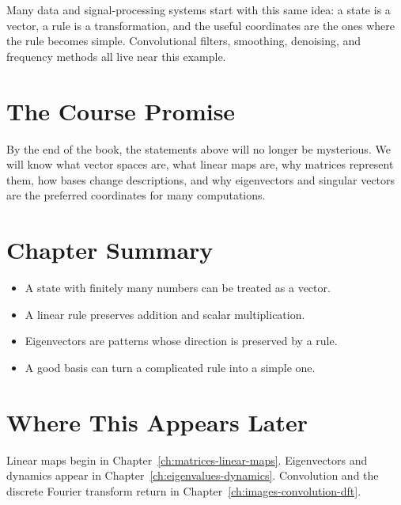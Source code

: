 \begin{aimlbox}
Many data and signal-processing systems start with this same idea: a state is
a vector, a rule is a transformation, and the useful coordinates are the ones
where the rule becomes simple. Convolutional filters, smoothing, denoising, and
frequency methods all live near this example.
\end{aimlbox}

\section{The Course Promise}

By the end of the book, the statements above will no longer be mysterious. We
will know what vector spaces are, what linear maps are, why matrices represent
them, how bases change descriptions, and why eigenvectors and singular vectors
are the preferred coordinates for many computations.

\section*{Chapter Summary}

\begin{itemize}
  \item A state with finitely many numbers can be treated as a vector.
  \item A linear rule preserves addition and scalar multiplication.
  \item Eigenvectors are patterns whose direction is preserved by a rule.
  \item A good basis can turn a complicated rule into a simple one.
\end{itemize}

\section*{Where This Appears Later}

Linear maps begin in Chapter~\ref{ch:matrices-linear-maps}. Eigenvectors and
dynamics appear in Chapter~\ref{ch:eigenvalues-dynamics}. Convolution and the
discrete Fourier transform return in Chapter~\ref{ch:images-convolution-dft}.


